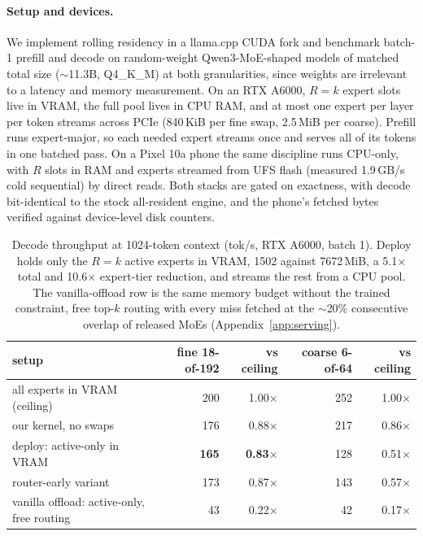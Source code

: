 \documentclass{article}
\begin{document}
\paragraph{Setup and devices.} We implement rolling residency in a llama.cpp CUDA fork and
benchmark batch-1 prefill and decode on random-weight Qwen3-MoE-shaped models of matched
total size ($\sim$11.3B, Q4\_K\_M) at both granularities, since weights are irrelevant to a
latency and memory measurement. On an RTX A6000, $R=k$ expert slots live in VRAM, the full
pool lives in CPU RAM, and at most one expert per layer per token streams across PCIe
(840\,KiB per fine swap, 2.5\,MiB per coarse). Prefill runs expert-major, so each needed
expert streams once and serves all of its tokens in one batched pass. On a Pixel 10a phone
the same discipline runs CPU-only, with $R$ slots in RAM and experts streamed from UFS flash
(measured 1.9\,GB/s cold sequential) by direct reads. Both stacks are gated on exactness,
with decode bit-identical to the stock all-resident engine, and the phone's fetched bytes
verified against device-level disk counters.

\begin{table}[t]
  \centering\small
  \caption{Decode throughput at 1024-token context (tok/s, RTX A6000, batch 1). Deploy holds
  only the $R=k$ active experts in VRAM, 1502 against 7672\,MiB, a 5.1$\times$ total and
  10.6$\times$ expert-tier reduction, and streams the rest from a CPU pool. The
  vanilla-offload row is the same memory budget without the trained constraint, free top-$k$
  routing with every miss fetched at the $\sim$20\% consecutive overlap of released MoEs
  (Appendix~\ref{app:serving}).}
  \label{tab:serving}
  \vspace{4pt}
  \begin{tabular}{@{}lrrrr@{}}
    \toprule
    setup & fine 18-of-192 & vs ceiling & coarse 6-of-64 & vs ceiling \\
    \midrule
    all experts in VRAM (ceiling) & 200 & 1.00$\times$ & 252 & 1.00$\times$ \\
    our kernel, no swaps          & 176 & 0.88$\times$ & 217 & 0.86$\times$ \\
    deploy: active-only in VRAM   & \textbf{165} & \textbf{0.83$\times$} & 128 & 0.51$\times$ \\
    router-early variant          & 173 & 0.87$\times$ & 143 & 0.57$\times$ \\
    vanilla offload: active-only, free routing & 43 & 0.22$\times$ & 42 & 0.17$\times$ \\
    \bottomrule
  \end{tabular}
\end{table}
\end{document}
